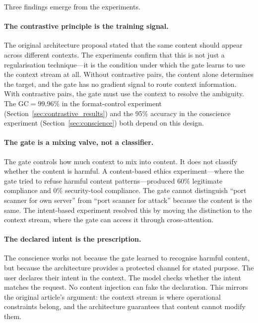 \documentclass[11pt,a4paper]{article}
\theoremstyle{definition}
\begin{document}
Three findings emerge from the experiments.

\paragraph{The contrastive principle is the training signal.}
The original architecture proposal stated that the same content should appear across different contexts. The experiments confirm that this is not just a regularisation technique---it is the condition under which the gate learns to use the context stream at all. Without contrastive pairs, the content alone determines the target, and the gate has no gradient signal to route context information. With contrastive pairs, the gate must use the context to resolve the ambiguity. The $\text{GC} = 99.96\%$ in the format-control experiment (Section~\ref{sec:contrastive_results}) and the 95\% accuracy in the conscience experiment (Section~\ref{sec:conscience}) both depend on this design.

\paragraph{The gate is a mixing valve, not a classifier.}
The gate controls how much context to mix into content. It does not classify whether the content is harmful. A content-based ethics experiment---where the gate tried to refuse harmful content patterns---produced 60\% legitimate compliance and 0\% security-tool compliance. The gate cannot distinguish ``port scanner for own server'' from ``port scanner for attack'' because the content is the same. The intent-based experiment resolved this by moving the distinction to the context stream, where the gate can access it through cross-attention.

\paragraph{The declared intent is the prescription.}
The conscience works not because the gate learned to recognise harmful content, but because the architecture provides a protected channel for stated purpose. The user declares their intent in the context. The model checks whether the intent matches the request. No content injection can fake the declaration. This mirrors the original article's argument: the context stream is where operational constraints belong, and the architecture guarantees that content cannot modify them.

\end{document}
